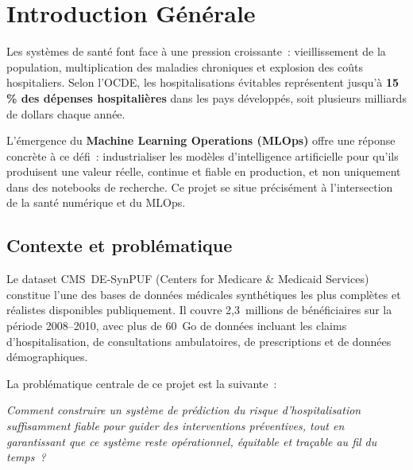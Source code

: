 \chapter*{Introduction Générale}

\begin{infobox}
Les systèmes de santé font face à une pression croissante~: vieillissement de la
population, multiplication des maladies chroniques et explosion des coûts
hospitaliers. Selon l'OCDE, les hospitalisations évitables représentent jusqu'à
\textbf{15\,\% des dépenses hospitalières} dans les pays développés, soit plusieurs
milliards de dollars chaque année.
\end{infobox}

\vspace{1em}

\noindent L'émergence du \textbf{Machine Learning Operations (MLOps)} offre une
réponse concrète à ce défi~: industrialiser les modèles d'intelligence artificielle
pour qu'ils produisent une valeur réelle, continue et fiable en production, et non
uniquement dans des notebooks de recherche. Ce projet se situe précisément à
l'intersection de la santé numérique et du MLOps.

\section*{Contexte et problématique}

Le dataset CMS~DE-SynPUF (Centers for Medicare \& Medicaid Services) constitue
l'une des bases de données médicales synthétiques les plus complètes et réalistes
disponibles publiquement. Il couvre 2,3~millions de bénéficiaires sur la période
2008--2010, avec plus de 60~Go de données incluant les claims d'hospitalisation,
de consultations ambulatoires, de prescriptions et de données démographiques.

\noindent La problématique centrale de ce projet est la suivante~:

\begin{criticalbox}
\textit{Comment construire un système de prédiction du risque d'hospitalisation
suffisamment fiable pour guider des interventions préventives, tout en garantissant
que ce système reste opérationnel, équitable et traçable au fil du temps~?}
\end{criticalbox}

